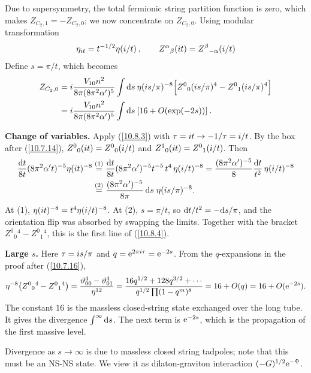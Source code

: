 	Due to supersymmetry, the total fermionic string partition function is zero, which makes $Z_{C_{2},1}=-Z_{C_{2},0}$; we now concentrate on $Z_{C_{2},0}$. Using modular transformation
	\begin{equation}
		\eta_{i t} =t^{-1/2} \eta(i/t) \:, \qquad Z^{\alpha}{}_{\beta}(i t) = Z^{\beta}{}_{-\alpha}(i/t)\label{10.8.3}
	\end{equation}
	Define $s=\pi/t$, which becomes
	\begin{align}
		Z_{C_{2},0} &= i \frac{V_{10}n^{2}}{8\pi(8\pi^{2}\alpha^{\prime})^{5}}
		\int \mathrm{d} s\:\eta(i s/\pi)^{-8}\Bigl[Z^{0}{}_{0}(i s/\pi)^{4}- Z^{0}{}_{1}(i s/\pi)^{4} \Bigr] \nonumber \\
		&=i \frac{V_{10}n^{2}}{8\pi(8\pi^{2}\alpha^{\prime})^{5}}
		\int \mathrm{d} s\: [16 + O(\exp(-2s))] \:. \label{10.8.4}
	\end{align}
	\begin{tcolorbox}[breakable]
		\begin{remark}
			\textbf{Change of variables.} Apply (\ref{10.8.3}) with $\tau=i t\to-1/\tau=i/t$. By the box after (\ref{10.7.14}), $Z^0{}_0(i t)=Z^0{}_0(i/t)$ and $Z^1{}_0(i t)=Z^0{}_1(i/t)$. Then
			\begin{align*}
				\frac{\mathrm{d} t}{8t}(8\pi^{2}\alpha't)^{-5}\eta(i t)^{-8}
				&\overset{(1)}{=}\frac{\mathrm{d} t}{8t}(8\pi^{2}\alpha')^{-5}t^{-5}\,t^{4}\,\eta(i/t)^{-8}
				=\frac{(8\pi^{2}\alpha')^{-5}}{8}\frac{\mathrm{d} t}{t^{2}}\,\eta(i/t)^{-8}\\
				&\overset{(2)}{=}\frac{(8\pi^{2}\alpha')^{-5}}{8\pi}\,\mathrm{d} s\;\eta(i s/\pi)^{-8} .
			\end{align*}
			At (1), $\eta(i t)^{-8}=t^{4}\eta(i/t)^{-8}$. At (2), $s=\pi/t$, so $\mathrm{d} t/t^{2}=-\mathrm{d} s/\pi$, and the orientation flip was absorbed by swapping the limits. Together with the bracket $Z^0{}_0{}^4-Z^0{}_1{}^4$, this is the first line of (\ref{10.8.4}).

			\textbf{Large $s$.} Here $\tau=i s/\pi$ and $q=\mathrm{e}^{2\pi i\tau}=\mathrm{e}^{-2s}$. From the $q$-expansions in the proof after (\ref{10.7.16}),
			\begin{equation*}
				\eta^{-8}\bigl(Z^0{}_0{}^{4}-Z^0{}_1{}^{4}\bigr)=\frac{\vartheta_{00}^{4}-\vartheta_{01}^{4}}{\eta^{12}}=\frac{16q^{1/2}+128q^{3/2}+\cdots}{q^{1/2}\prod(1-q^m)^{8}}=16+O(q)=16+O(\mathrm{e}^{-2s}) .
			\end{equation*}
			The constant $16$ is the massless closed-string state exchanged over the long tube. It gives the divergence $\int^\infty\mathrm{d} s$. The next term is $\mathrm{e}^{-2s}$, which is the propagation of the first massive level.
		\end{remark}
	\end{tcolorbox}
	Divergence as $s\to\infty$ is due to massless closed string tadpoles; note that this must be an NS-NS state. We view it as dilaton-graviton interaction $(-G)^{1/2}\mathrm{e}^{-\Phi}$.
	
